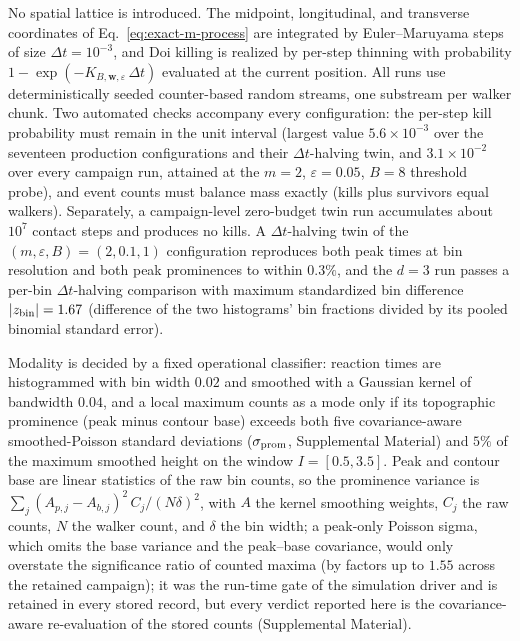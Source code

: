 \documentclass[aps,physrev,reprint,amsmath,amssymb,longbibliography,floatfix]{revtex4-2}
\begin{document}
No spatial lattice is introduced.  The midpoint, longitudinal, and
transverse coordinates of Eq.~\eqref{eq:exact-m-process} are integrated by
Euler--Maruyama steps of size \(\Delta t=10^{-3}\), and Doi killing is
realized by per-step thinning with probability
\(1-\exp(-K_{B,\bm w,\varepsilon}\,\Delta t)\) evaluated at the current
position.  All runs use deterministically seeded counter-based random
streams, one substream per walker chunk.  Two automated checks accompany
every configuration: the per-step kill probability must remain in the unit
interval (largest value \(5.6\times10^{-3}\) over the seventeen production
configurations and their \(\Delta t\)-halving twin, and \(3.1\times10^{-2}\)
over every campaign run, attained at
the \(m=2\), \(\varepsilon=0.05\), \(B=8\) threshold probe), and event counts must balance mass exactly (kills plus
survivors equal walkers).  Separately, a campaign-level zero-budget twin run
accumulates about \(10^{7}\) contact steps and produces no kills.  A
\(\Delta t\)-halving twin of the
\((m,\varepsilon,B)=(2,0.1,1)\) configuration reproduces both peak times at
bin resolution and both peak prominences to within \(0.3\%\), and the
\(d=3\) run passes a per-bin \(\Delta t\)-halving comparison with maximum
standardized bin difference \(|z_{\rm bin}|=1.67\) (difference of the two
histograms' bin fractions divided by its pooled binomial standard error).

Modality is decided by a fixed operational
classifier: reaction times are histogrammed with bin width \(0.02\) and
smoothed with a Gaussian kernel of bandwidth \(0.04\), and a local maximum
counts as a mode only if its topographic prominence (peak minus contour
base) exceeds both five covariance-aware smoothed-Poisson standard
deviations (\(\sigma_{\rm prom}\), Supplemental Material) and \(5\%\) of the maximum smoothed height on the window
\(I=[0.5,3.5]\).  Peak and contour base are linear statistics of the raw
bin counts, so the prominence variance is
\(\sum_j (A_{p,j}-A_{b,j})^2\,C_j/(N\delta)^2\), with \(A\) the kernel
smoothing weights, \(C_j\) the raw counts, \(N\) the walker count, and
\(\delta\) the bin width; a peak-only Poisson sigma, which omits the base
variance and the peak--base covariance, would only overstate the
significance ratio of counted maxima (by factors up to \(1.55\) across the
retained campaign); it was the run-time gate of the simulation driver and is
retained in every stored record, but every verdict reported here is the
covariance-aware re-evaluation of the stored counts (Supplemental Material).
\end{document}
